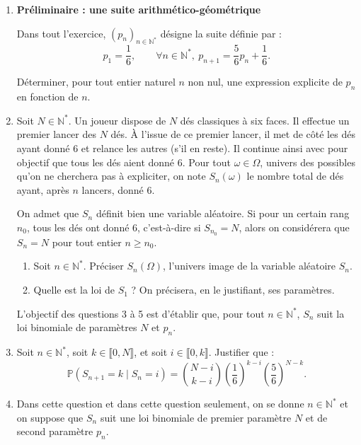 \documentclass{article}
\begin{document}
\begin{enumerate}
    \item \textbf{Préliminaire : une suite arithmético-géométrique}

    Dans tout l'exercice, $(p_n)_{n \in \mathbb{N}^*}$ désigne la suite définie par :
    \[
        p_1 = \frac{1}{6}, \qquad \forall n \in \mathbb{N}^*,\ p_{n+1} = \frac{5}{6}p_n + \frac{1}{6}.
    \]
    
    Déterminer, pour tout entier naturel $n$ non nul, une expression explicite de $p_n$ en fonction de $n$.

    \item Soit $N \in \mathbb{N}^*$. Un joueur dispose de $N$ dés classiques à six faces. Il effectue un premier lancer des $N$ dés. À l'issue de ce premier lancer, il met de côté les dés ayant donné 6 et relance les autres (s'il en reste). Il continue ainsi avec pour objectif que tous les dés aient donné 6. Pour tout $\omega \in \Omega$, univers des possibles qu'on ne cherchera pas à expliciter, on note $S_n(\omega)$ le nombre total de dés ayant, après $n$ lancers, donné 6.
    
    On admet que $S_n$ définit bien une variable aléatoire. Si pour un certain rang $n_0$, tous les dés ont donné 6, c'est-à-dire si $S_{n_0} = N$, alors on considérera que $S_n = N$ pour tout entier $n \geq n_0$.
    
    \begin{enumerate}
        \item Soit $n \in \mathbb{N}^*$. Préciser $S_n(\Omega)$, l'univers image de la variable aléatoire $S_n$.
        
        \item Quelle est la loi de $S_1$ ? On précisera, en le justifiant, ses paramètres.
    \end{enumerate}

    L'objectif des questions 3 à 5 est d'établir que, pour tout $n \in \mathbb{N}^*$, $S_n$ suit la loi binomiale de paramètres $N$ et $p_n$.
    
    \item Soit $n \in \mathbb{N}^*$, soit $k \in \llbracket 0,N \rrbracket$, et soit $i \in \llbracket 0,k \rrbracket$. Justifier que :
    \[
        \mathbb{P}(S_{n+1} = k \mid S_n = i)
        =
        \binom{N-i}{k-i}
        \left(\frac{1}{6}\right)^{k-i}
        \left(\frac{5}{6}\right)^{N-k}.
    \]
    
    \item Dans cette question et dans cette question seulement, on se donne $n \in \mathbb{N}^*$ et on suppose que $S_n$ suit une loi binomiale de premier paramètre $N$ et de second paramètre $p_n$.
    

\end{enumerate}
\end{document}
